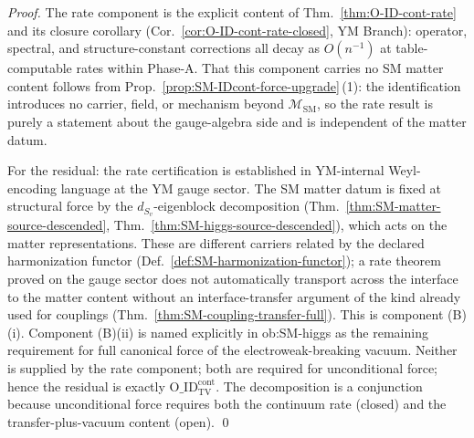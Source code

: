 \documentclass[12pt,oneside]{amsbook}
\theoremstyle{plain}
\theoremstyle{definition}
\theoremstyle{remark}
\begin{document}
\begin{proof}
The rate component is the explicit content of
Thm.~\ref{thm:O-ID-cont-rate} and its closure corollary
(Cor.~\ref{cor:O-ID-cont-rate-closed}, YM Branch): operator,
spectral, and structure-constant corrections all decay as
$O(n^{-1})$ at table-computable rates within Phase-A.  That this
component carries no SM matter content follows from
Prop.~\ref{prop:SM-IDcont-force-upgrade}\,(1): the identification
introduces no carrier, field, or mechanism beyond
$\mathcal{M}_{\mathrm{SM}}$, so the rate result is purely a
statement about the gauge-algebra side and is independent of the
matter datum.

For the residual: the rate certification is established in
YM-internal Weyl-encoding language at the YM gauge sector.  The SM
matter datum is fixed at structural force by the
$d_{S_v}$-eigenblock decomposition
(Thm.~\ref{thm:SM-matter-source-descended},
Thm.~\ref{thm:SM-higgs-source-descended}), which acts on the
matter representations.  These are different carriers related by
the declared harmonization functor
(Def.~\ref{def:SM-harmonization-functor}); a rate theorem proved
on the gauge sector does not automatically transport across the
interface to the matter content without an interface-transfer
argument of the kind already used for couplings
(Thm.~\ref{thm:SM-coupling-transfer-full}).  This is component
(B)(i).  Component (B)(ii) is named explicitly in ob:SM-higgs as
the remaining requirement for full canonical force of the
electroweak-breaking vacuum.  Neither is supplied by the rate
component; both are required for unconditional force; hence the
residual is exactly $\mathrm{O\_ID}^{\mathrm{cont}}_{\mathrm{TV}}$.
The decomposition is a conjunction because unconditional force
requires both the continuum rate (closed) and the
transfer-plus-vacuum content (open). \qed
\end{proof}
\end{document}
